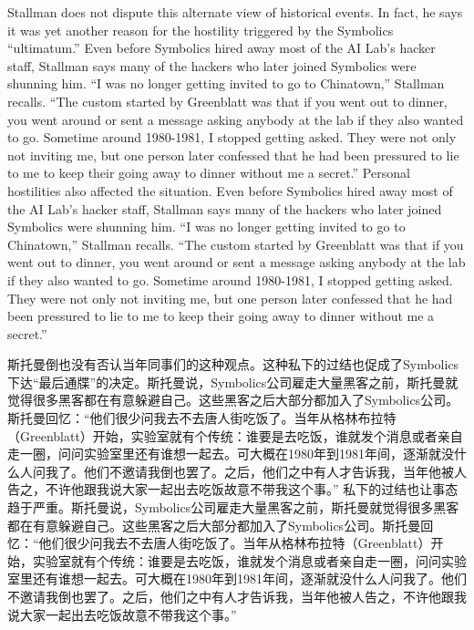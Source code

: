 \ifdefined\eng
\ifdefined\vone
Stallman does not dispute this alternate view of historical events. In fact, he says it was yet another reason for the hostility triggered by the Symbolics ``ultimatum.'' Even before Symbolics hired away most of the AI Lab's hacker staff, Stallman says many of the hackers who later joined Symbolics were shunning him. ``I was no longer getting invited to go to Chinatown,'' Stallman recalls. ``The custom started by Greenblatt was that if you went out to dinner, you went around or sent a message asking anybody at the lab if they also wanted to go. Sometime around 1980-1981, I stopped getting asked. They were not only not inviting me, but one person later confessed that he had been pressured to lie to me to keep their going away to dinner without me a secret.''
\fi
\ifdefined\vtwo
Personal hostilities also affected the situation.   Even before Symbolics hired away most of the AI Lab's hacker staff, Stallman says many of the hackers who later joined Symbolics were shunning him. ``I was no longer getting invited to go to Chinatown,'' Stallman recalls. ``The custom started by Greenblatt was that if you went out to dinner, you went around or sent a message asking anybody at the lab if they also wanted to go. Sometime around 1980-1981, I stopped getting asked. They were not only not inviting me, but one person later confessed that he had been pressured to lie to me to keep their going away to dinner without me a secret.''
\fi
\fi

\ifdefined\chs
\ifdefined\vone
斯托曼倒也没有否认当年同事们的这种观点。这种私下的过结也促成了Symbolics下达``最后通牒''的决定。斯托曼说，Symbolics公司雇走大量黑客之前，斯托曼就觉得很多黑客都在有意躲避自己。这些黑客之后大部分都加入了Symbolics公司。斯托曼回忆：``他们很少问我去不去唐人街吃饭了。当年从格林布拉特（Greenblatt）开始，实验室就有个传统：谁要是去吃饭，谁就发个消息或者亲自走一圈，问问实验室里还有谁想一起去。可大概在1980年到1981年间，逐渐就没什么人问我了。他们不邀请我倒也罢了。之后，他们之中有人才告诉我，当年他被人告之，不许他跟我说大家一起出去吃饭故意不带我这个事。''
\fi
\ifdefined\vtwo
私下的过结也让事态趋于严重。斯托曼说，Symbolics公司雇走大量黑客之前，斯托曼就觉得很多黑客都在有意躲避自己。这些黑客之后大部分都加入了Symbolics公司。斯托曼回忆：``他们很少问我去不去唐人街吃饭了。当年从格林布拉特（Greenblatt）开始，实验室就有个传统：谁要是去吃饭，谁就发个消息或者亲自走一圈，问问实验室里还有谁想一起去。可大概在1980年到1981年间，逐渐就没什么人问我了。他们不邀请我倒也罢了。之后，他们之中有人才告诉我，当年他被人告之，不许他跟我说大家一起出去吃饭故意不带我这个事。''
\fi
\fi

